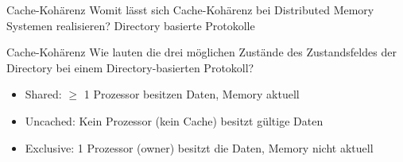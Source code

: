 \begin{aufgabe}{Cache-Kohärenz}
    Womit lässt sich Cache-Kohärenz bei Distributed Memory Systemen realisieren?
    \tcblower
    Directory basierte Protokolle
\end{aufgabe}

\begin{aufgabe}{Cache-Kohärenz}
    Wie lauten die drei möglichen Zustände des Zustandsfeldes der Directory bei einem Directory-basierten Protokoll?
    \tcblower
    \begin{itemize}
        \item Shared: $\geq$ 1 Prozessor besitzen Daten, Memory aktuell
        \item Uncached: Kein Prozessor (kein Cache) besitzt gültige Daten
        \item Exclusive: 1 Prozessor (owner) besitzt die Daten, Memory nicht aktuell
    \end{itemize}
\end{aufgabe}